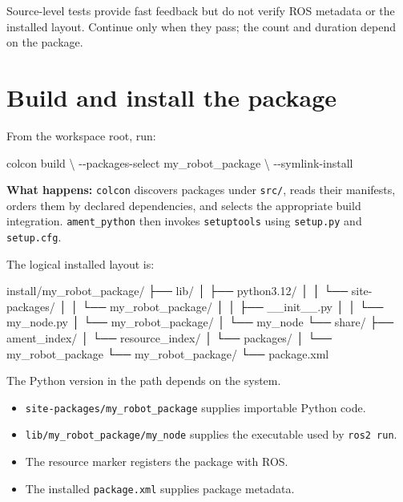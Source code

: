 \documentclass[
  australian,
  12pt,
  letterpaper,
  DIV=11,
  numbers=noendperiod,
  twoside]{scrreprt}
\newenvironment{Shaded}{\begin{snugshade}}{\end{snugshade}}
\newcommand{\AttributeTok}[1]{\textcolor[rgb]{0.40,0.45,0.13}{#1}}
\newcommand{\DataTypeTok}[1]{\textcolor[rgb]{0.68,0.00,0.00}{#1}}
\newcommand{\ExtensionTok}[1]{\textcolor[rgb]{0.00,0.23,0.31}{#1}}
\newcommand{\NormalTok}[1]{\textcolor[rgb]{0.00,0.23,0.31}{#1}}
\providecommand{\tightlist}{%
  \setlength{\itemsep}{0pt}\setlength{\parskip}{0pt}}
\begin{document}
Source-level tests provide fast feedback but do not verify ROS metadata
or the installed layout. Continue only when they pass; the count and
duration depend on the package.

\section{Build and install the
package}\label{build-and-install-the-package}

From the workspace root, run:

\begin{Shaded}
\begin{Highlighting}[]
\ExtensionTok{colcon}\NormalTok{ build }\DataTypeTok{\textbackslash{}}
  \AttributeTok{{-}{-}packages{-}select}\NormalTok{ my\_robot\_package }\DataTypeTok{\textbackslash{}}
  \AttributeTok{{-}{-}symlink{-}install}
\end{Highlighting}
\end{Shaded}

\textbf{What happens:} \texttt{colcon} discovers packages under
\texttt{src/}, reads their manifests, orders them by declared
dependencies, and selects the appropriate build integration.
\texttt{ament\_python} then invokes \texttt{setuptools} using
\texttt{setup.py} and \texttt{setup.cfg}.

The logical installed layout is:

\begin{Shaded}
\begin{Highlighting}[]
\NormalTok{install/my\_robot\_package/}
\NormalTok{├── lib/}
\NormalTok{│   ├── python3.12/}
\NormalTok{│   │   └── site{-}packages/}
\NormalTok{│   │       └── my\_robot\_package/}
\NormalTok{│   │           ├── \_\_init\_\_.py}
\NormalTok{│   │           └── my\_node.py}
\NormalTok{│   └── my\_robot\_package/}
\NormalTok{│       └── my\_node}
\NormalTok{└── share/}
\NormalTok{    ├── ament\_index/}
\NormalTok{    │   └── resource\_index/}
\NormalTok{    │       └── packages/}
\NormalTok{    │           └── my\_robot\_package}
\NormalTok{    └── my\_robot\_package/}
\NormalTok{        └── package.xml}
\end{Highlighting}
\end{Shaded}

The Python version in the path depends on the system.

\begin{itemize}
\tightlist
\item
  \texttt{site-packages/my\_robot\_package} supplies importable Python
  code.
\item
  \texttt{lib/my\_robot\_package/my\_node} supplies the executable used
  by \texttt{ros2\ run}.
\item
  The resource marker registers the package with ROS.
\item
  The installed \texttt{package.xml} supplies package metadata.
\end{itemize}
\end{document}
